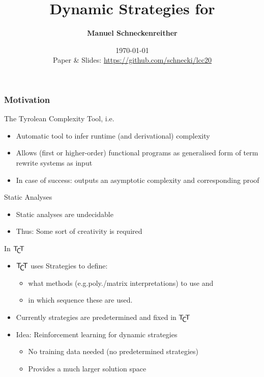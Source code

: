 \documentclass[xcolor=table%
,t]{beamer}
\title[Dynamic Strategies for \tct{}]{Dynamic Strategies for \tct{}}
\author[Manuel Schneckenreither]{\textbf{Manuel Schneckenreither}}
\institute{
  Department of Computer Science\\
  University of Innsbruck, Austria\\
  email: manuel.schneckenreither@uibk.ac.at
}
\date{\today \\[2ex]\tiny Paper \& Slides: \url{https://github.com/schnecki/lcc20}}
\begin{document}
\frame{\titlepage}

\begin{frame}[t]
  \frametitle{Motivation}

  \vspace{-1.5ex}
  \begin{block}{The Tyrolean Complexity Tool, i.e. \tct{}}

    \begin{itemize}
    \item Automatic tool to infer runtime (and derivational) complexity
    \item Allows (first or higher-order) functional programs as generalised form of
      term rewrite systems as input
    \item In case of success: \tct{} outputs an asymptotic complexity and corresponding proof
    \end{itemize}
  \end{block}\pause
  \begin{block}{Static Analyses}
    \begin{itemize}
    \item Static analyses are undecidable~\footnotemark{}
    \item Thus: Some sort of creativity is required
    \end{itemize}
  \end{block}
  \begin{centering}
    \footnotesize
    \addtocounter{footnote}{-1}

  \end{centering}

\end{frame}
\begin{frame}[t]


  \begin{block}{In \(\tct{}\)}
    \begin{itemize}
    \item \(\tct{}\) uses Strategies to define: 
      \begin{itemize}
      \item what methods (e.g.\@ poly./matrix interpretations) to use and 
      \item in which sequence these are used.
      \end{itemize}
      \item Currently strategies are predetermined and fixed in \(\tct{}\)
      \item Idea: Reinforcement learning for dynamic strategies
        \begin{itemize}
        \item No training data needed (no predetermined strategies)
        \item Provides a much larger solution space
        \end{itemize}
      \end{itemize}
  \end{block}


\end{frame}
\end{document}
